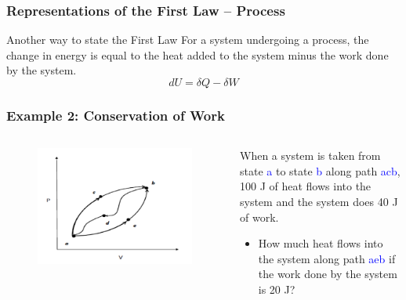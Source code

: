 \documentclass[10pt,compress]{beamer}
\begin{document}
\begin{frame}
 \frametitle{Representations of the First Law -- Process}
 \begin{block}{Another way to state the First Law} 
  For a system undergoing a process, the change in energy is equal to the heat added to the system minus the work done by the system.
  \begin{displaymath}
   dU =\delta Q - \delta W 
  \end{displaymath}
 \end{block}
\end{frame}


\begin{frame}
 \frametitle{Example 2: Conservation of Work}
 \scriptsize
 \begin{columns}
  \begin{column}[r]{0.5\linewidth}
   \begin{figure}%
    \begin{center}
     \includegraphics[width=\columnwidth,clip]{./Pics/First_Law_1}
    \end{center}
   \end{figure}
  \end{column}
  \begin{column}[r]{0.5\linewidth}
   When a system is taken from state \textcolor{blue}{a} to state \textcolor{blue}{b} along path \textcolor{blue}{acb}, 100 J of heat flows into the system and the system does 40 J of work. 
   \begin{itemize}
    \item<2-> How much heat flows into the system along path \textcolor{blue}{aeb} if the work done by the system is 20 J?\\

\end{itemize}
\end{column}
\end{columns}
\end{frame}
\end{document}
